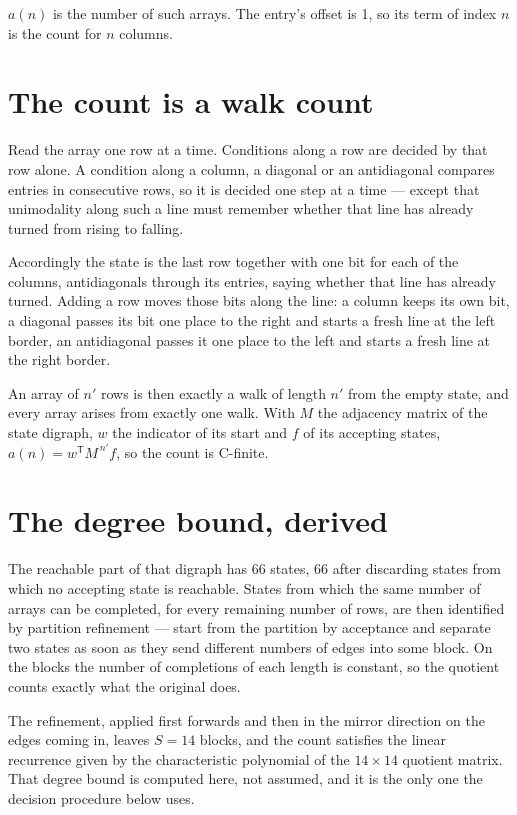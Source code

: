 \documentclass[11pt]{article}
\theoremstyle{definition}
\begin{document}
$a(n)$ is the number of such arrays. The entry's offset is 1, so its term of index $n$ is the count for $n$ columns.

\section{The count is a walk count}

Read the array one row at a time. Conditions along a row are decided by that row alone. A condition along a column, a diagonal or an antidiagonal compares entries in consecutive rows, so it is decided one step at a time --- except that unimodality along such a line must remember whether that line has already turned from rising to falling.

Accordingly the state is the last row together with one bit for each of the columns, antidiagonals through its entries, saying whether that line has already turned. Adding a row moves those bits along the line: a column keeps its own bit, a diagonal passes its bit one place to the right and starts a fresh line at the left border, an antidiagonal passes it one place to the left and starts a fresh line at the right border.

An array of $n'$ rows is then exactly a walk of length $n'$ from the empty state, and every array arises from exactly one walk. With $M$ the adjacency matrix of the state digraph, $w$ the indicator of its start and $f$ of its accepting states, $a(n) = w^{\mathsf T}M^{\,n'}f$, so the count is C-finite.

\section{The degree bound, derived}

The reachable part of that digraph has $66$ states, $66$ after discarding states from which no accepting state is reachable. States from which the same number of arrays can be completed, for every remaining number of rows, are then identified by partition refinement --- start from the partition by acceptance and separate two states as soon as they send different numbers of edges into some block. On the blocks the number of completions of each length is constant, so the quotient counts exactly what the original does.

The refinement, applied first forwards and then in the mirror direction on the edges coming in, leaves $S = 14$ blocks, and the count satisfies the linear recurrence given by the characteristic polynomial of the $14 \times 14$ quotient matrix. That degree bound is computed here, not assumed, and it is the only one the decision procedure below uses.
\end{document}
